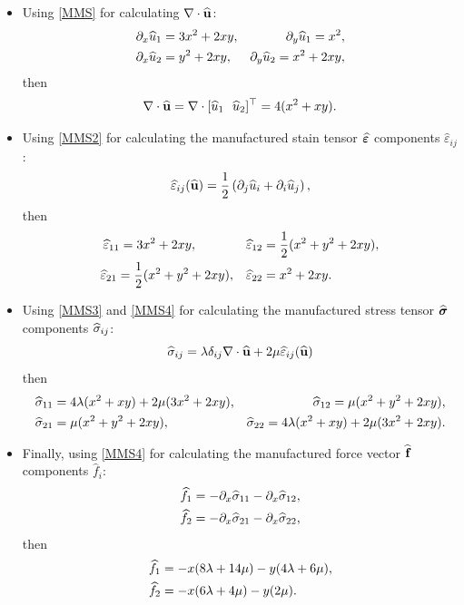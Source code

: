 \begin{itemize}
\item Using \eqref{MMS} for calculating $\nabla\cdot\widehat{\textbf{u}}$:
%
\begin{equation}\label{MMS2}
\begin{aligned}
&\partial_x\widehat{u}_1=3x^2+2xy, &~\partial_y\widehat{u}_1=x^2,\\
&\partial_x\widehat{u}_2=y^2+2xy,  &\partial_y\widehat{u}_2=x^2+2xy,
\end{aligned}
\end{equation}
then
\begin{equation}\label{MMS3}
\nabla\cdot\widehat{\mathbf{u}}=\nabla\cdot[\widehat{u}_1~~\widehat{u}_2]^\top=4(x^2+xy).
\end{equation}
\item Using \eqref{MMS2} for  calculating the manufactured stain tensor $\widehat{\boldsymbol{\varepsilon}}$ components $\widehat{\varepsilon}_{ij}$:
	\begin{equation*}
	\widehat{\varepsilon}_{ij}(\widehat{{\textbf{u}}})=\frac{1}{2}\left( \partial_j \widehat{u}_i+ \partial_i \widehat{u}_j\right),
	\end{equation*}
then
\begin{equation}\label{MMS4}
\begin{aligned}
\widehat{\varepsilon}_{11}=3x^2+2xy,\quad\quad\quad\quad &\widehat{\varepsilon}_{12}=\frac{1}{2}(x^2+y^2+2xy),\\
\widehat{\varepsilon}_{21}=\frac{1}{2}(x^2+y^2+2xy),\quad   &\widehat{\varepsilon}_{22}=x^2+2xy.
\end{aligned}
\end{equation}
\item Using \eqref{MMS3} and \eqref{MMS4} for calculating the manufactured stress tensor $\widehat{\boldsymbol{\sigma}}$ components $\widehat{\sigma}_{ij}$:
\begin{equation*}
\widehat{\sigma}_{ij}=\lambda\delta_{ij}\nabla\cdot\widehat{\textbf{u}}+2\mu\widehat{\varepsilon}_{ij}(\widehat{\textbf{u}})
\end{equation*}
then
\begin{equation}
\begin{aligned}
&\widehat{\sigma}_{11}=4\lambda(x^2+xy)+2\mu(3x^2+2xy),&\widehat{\sigma}_{12}=\mu(x^2+y^2+2xy),\\
&\widehat{\sigma}_{21}=\mu(x^2+y^2+2xy),&\widehat{\sigma}_{22}=4\lambda(x^2+xy)+2\mu(3x^2+2xy).
\end{aligned}
\end{equation}
\item Finally,  using \eqref{MMS4} for calculating the manufactured force vector $\widehat{\textbf{f}}$ components $\widehat{f}_i$:
\begin{equation*}
\begin{aligned}
&\widehat{f}_{1}=-\partial_x\widehat{\sigma}_{11}-\partial_x\widehat{\sigma}_{12},\\
&\widehat{f}_{2}=-\partial_x\widehat{\sigma}_{21}-\partial_x\widehat{\sigma}_{22},
\end{aligned}
\end{equation*}
then
\begin{equation}\label{MMS-force}
\begin{aligned}
&\widehat{f}_{1}=-x(8\lambda+14\mu)-y(4\lambda+6\mu),\\
&\widehat{f}_{2}=-x(6\lambda+4\mu)-y(2\mu).
\end{aligned}
\end{equation}


\end{itemize}
